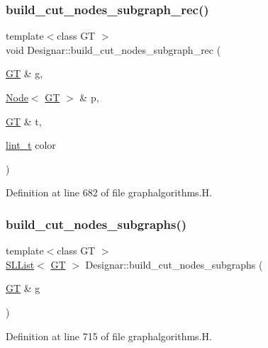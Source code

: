 \subsubsection{\texorpdfstring{build\+\_\+cut\+\_\+nodes\+\_\+subgraph\+\_\+rec()}{build\_cut\_nodes\_subgraph\_rec()}}
{\footnotesize\ttfamily template$<$class GT $>$ \\
void Designar\+::build\+\_\+cut\+\_\+nodes\+\_\+subgraph\+\_\+rec (\begin{DoxyParamCaption}\item[{\hyperlink{demo-buildgraph_8_c_a3001c40d2c31ca87ed96cd7d1334a55e}{GT} \&}]{g,  }\item[{\hyperlink{namespace_designar_a5af326c65aa2bd26b26c410f2030d09e}{Node}$<$ \hyperlink{demo-buildgraph_8_c_a3001c40d2c31ca87ed96cd7d1334a55e}{GT} $>$ \&}]{p,  }\item[{\hyperlink{demo-buildgraph_8_c_a3001c40d2c31ca87ed96cd7d1334a55e}{GT} \&}]{t,  }\item[{\hyperlink{namespace_designar_a9d113d66a39e82b73727c72cd3a52f73}{lint\+\_\+t}}]{color }\end{DoxyParamCaption})}



Definition at line 682 of file graphalgorithms.\+H.

\mbox{\label{namespace_designar_a8e15ec16859d46fd3c50bb9a295a1ea6}} 
\subsubsection{\texorpdfstring{build\+\_\+cut\+\_\+nodes\+\_\+subgraphs()}{build\_cut\_nodes\_subgraphs()}}
{\footnotesize\ttfamily template$<$class GT $>$ \\
\hyperlink{class_designar_1_1_s_l_list}{S\+L\+List}$<$ \hyperlink{demo-buildgraph_8_c_a3001c40d2c31ca87ed96cd7d1334a55e}{GT} $>$ Designar\+::build\+\_\+cut\+\_\+nodes\+\_\+subgraphs (\begin{DoxyParamCaption}\item[{\hyperlink{demo-buildgraph_8_c_a3001c40d2c31ca87ed96cd7d1334a55e}{GT} \&}]{g }\end{DoxyParamCaption})}



Definition at line 715 of file graphalgorithms.\+H.

